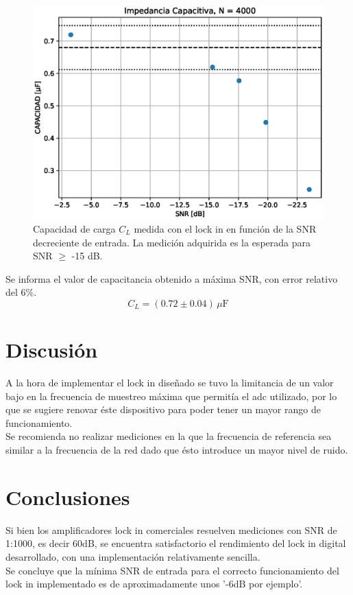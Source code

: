 \documentclass[11pt,a4paper]{extarticle}
\begin{document}
\begin{multicols}{2}
\begin{figure}[H]
	\centering
	\includegraphics[width=\linewidth]{Images/capacitor4000.eps}
	\caption{Capacidad de carga $C_L$ medida con 
	el lock in en función de la SNR decreciente de entrada.
	La medición adquirida es la esperada para SNR $\ge$ -15 dB.}
	\label{fig:CvsSNR}
\end{figure}

Se informa el valor de capacitancia obtenido a máxima SNR, con error relativo del 6\%.
\begin{equation*}
	C_L = \left(0.72 \pm 0.04\right) \, \mu \mathrm F
\end{equation*}

\section{Discusión}
A la hora de implementar el lock in diseñado se tuvo 
la limitancia de un valor bajo en la frecuencia de 
muestreo máxima que permitía el adc utilizado, por lo 
que se sugiere renovar éste 
dispositivo para poder tener un mayor 
rango de funcionamiento.\\

Se recomienda no realizar mediciones 
en la que la frecuencia de referencia sea 
similar a la frecuencia de la red dado que 
ésto introduce un mayor nivel de ruido.


\section{Conclusiones}

Si bien los amplificadores lock in comerciales resuelven 
mediciones con SNR de 1:1000, es decir 60dB,
 se encuentra satisfactorio 
el rendimiento del lock in digital desarrollado, con 
una implementación relativamente sencilla.\\

Se concluye que la mínima SNR de entrada para el 
correcto funcionamiento del lock in implementado es de 
aproximadamente unos '-6dB por ejemplo'.




\end{multicols}
\end{document}

